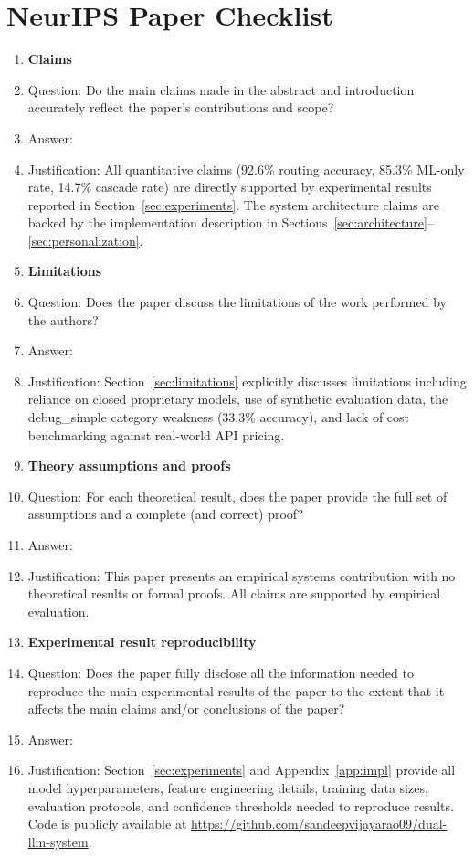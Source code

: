 \section*{NeurIPS Paper Checklist}

\begin{enumerate}

\item {\bf Claims}
    \item[] Question: Do the main claims made in the abstract and introduction accurately reflect the paper's contributions and scope?
    \item[] Answer: \answerYes{}
    \item[] Justification: All quantitative claims (92.6\% routing accuracy, 85.3\% ML-only rate, 14.7\% cascade rate) are directly supported by experimental results reported in Section~\ref{sec:experiments}. The system architecture claims are backed by the implementation description in Sections~\ref{sec:architecture}--\ref{sec:personalization}.

\item {\bf Limitations}
    \item[] Question: Does the paper discuss the limitations of the work performed by the authors?
    \item[] Answer: \answerYes{}
    \item[] Justification: Section~\ref{sec:limitations} explicitly discusses limitations including reliance on closed proprietary models, use of synthetic evaluation data, the debug\_simple category weakness (33.3\% accuracy), and lack of cost benchmarking against real-world API pricing.

\item {\bf Theory assumptions and proofs}
    \item[] Question: For each theoretical result, does the paper provide the full set of assumptions and a complete (and correct) proof?
    \item[] Answer: \answerNA{}
    \item[] Justification: This paper presents an empirical systems contribution with no theoretical results or formal proofs. All claims are supported by empirical evaluation.

    \item {\bf Experimental result reproducibility}
    \item[] Question: Does the paper fully disclose all the information needed to reproduce the main experimental results of the paper to the extent that it affects the main claims and/or conclusions of the paper?
    \item[] Answer: \answerYes{}
    \item[] Justification: Section~\ref{sec:experiments} and Appendix~\ref{app:impl} provide all model hyperparameters, feature engineering details, training data sizes, evaluation protocols, and confidence thresholds needed to reproduce results. Code is publicly available at \url{https://github.com/sandeepvijayarao09/dual-llm-system}.


\end{enumerate}
